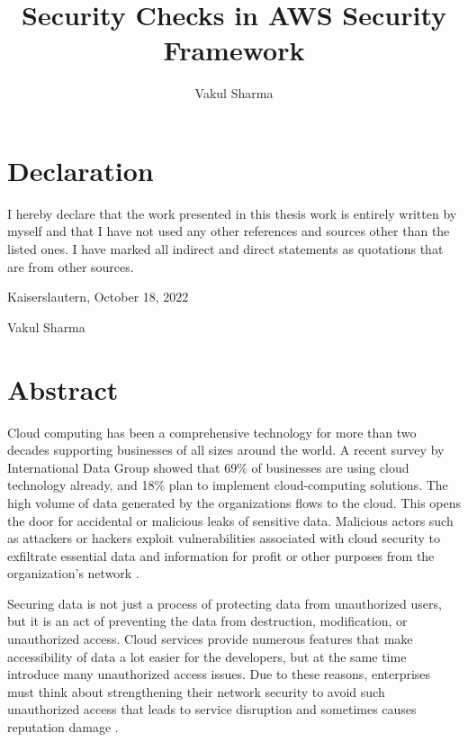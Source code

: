 \documentclass[a4paper,11pt]{report}
\begin{document}
\title{Security Checks in AWS Security Framework}

\author{Vakul Sharma}

\maketitle


\clearpage
\section*{Declaration}
\text
I hereby declare that the work presented in this thesis work is entirely written by myself and that I have not used any other references and sources other than the listed ones.
I have marked all indirect and direct statements as
quotations that are from other sources.\\

\raggedright{Kaiserslautern, October 18, 2022}\\

\hfill \break
\raggedright{Vakul Sharma}


\cleardoublepage

\section*{Abstract}
\text
Cloud computing has been a comprehensive technology for more
than two decades supporting
businesses of all sizes around the world.
A recent survey by International Data Group showed that 69\%
of businesses are using cloud technology already, and
18\% plan
to implement cloud-computing solutions.
The high volume of data generated by the organizations flows to the cloud.
This opens the door for accidental or malicious leaks of sensitive data.
Malicious actors such as attackers or hackers exploit vulnerabilities associated with cloud security to exfiltrate essential data and information for profit or other purposes from the organization’s network \cite{1}.

\hfill \break

Securing data is not just a process of protecting data
from unauthorized users, but it is an act of preventing
the data from destruction, modification, or
unauthorized access.
Cloud services provide numerous features that make accessibility of data a lot easier for the developers, but at the same time introduce many unauthorized access issues.
Due to these reasons, enterprises must think
about strengthening
their network security to avoid such unauthorized access that leads to service disruption and sometimes causes reputation damage \cite{1}.
\end{document}
